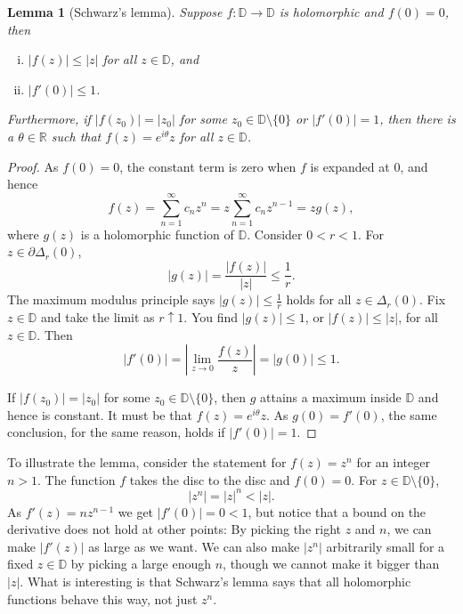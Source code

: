 \documentclass[12pt,openany]{book}
\newcommand{\sabs}[1]{\lvert {#1} \rvert}
\newcommand{\abs}[1]{\left\lvert {#1} \right\rvert}
\newcommand{\R}{{\mathbb{R}}}
\newcommand{\D}{{\mathbb{D}}}
\theoremstyle{plain}
\newtheorem{lemma}[thm]{Lemma}
\theoremstyle{remark}
\theoremstyle{definition}
\theoremstyle{exercise}
\theoremstyle{example}
\begin{document}
\begin{lemma}[Schwarz's lemma]\label{lemma:schwarz}
Suppose $f \colon \D \to \D$ is holomorphic and $f(0) = 0$,
then 
\begin{enumerate}[(i)]
\item $\sabs{f(z)} \leq \sabs{z}$ for all $z \in \D$, and
\item $\sabs{f'(0)} \leq 1$.
\end{enumerate}
Furthermore, if $\sabs{f(z_0)} = \sabs{z_0}$ for some $z_0 \in \D \setminus
\{ 0 \}$
or $\sabs{f'(0)} = 1$, then
there is a $\theta \in \R$ such that $f(z) =
e^{i\theta} z$ for all $z \in \D$.
\end{lemma}

\begin{proof}
As $f(0) = 0$, the constant term is zero when $f$ is expanded at $0$, and hence
\begin{equation*}
f(z) = \sum_{n=1}^\infty c_n z^n = z \sum_{n=1}^\infty c_n z^{n-1} = z g(z) ,
\end{equation*}
where $g(z)$ is a holomorphic function of $\D$.
Consider $0 < r < 1$.
For $z \in \partial \Delta_r(0)$,
\begin{equation*}
\sabs{g(z)} = \frac{\sabs{f(z)}}{\sabs{z}} \leq \frac{1}{r}  .
\end{equation*}
The maximum modulus principle says $\sabs{g(z)} \leq \frac{1}{r}$
holds for all $z \in \Delta_r(0)$.
Fix $z \in \D$ and take the limit as $r \uparrow 1$. 
You find
$\sabs{g(z)} \leq 1$,
or
$\sabs{f(z)} \leq \sabs{z}$,
for all $z \in \D$.  Then
\begin{equation*}
\abs{f'(0)}
=
\abs{\lim_{z \to 0} \frac{f(z)}{z}} = \sabs{g(0)} \leq 1 .
\end{equation*}

If $\sabs{f(z_0)} = \sabs{z_0}$ for some $z_0 \in \D \setminus \{ 0 \}$,
then $g$ attains a maximum inside $\D$ and hence is constant.
It must be that $f(z) = e^{i \theta} z$.
As $g(0) = f'(0)$, the same conclusion, for the same reason,
holds if $\sabs{f'(0)} = 1$.
\end{proof}

To illustrate the lemma, consider the statement for $f(z) = z^n$
for an integer $n > 1$.  The function $f$ takes the disc to the disc
and $f(0) = 0$.  For $z \in \D \setminus \{ 0 \}$,
\begin{equation*}
\sabs{z^n} =
\sabs{z}^n < \sabs{z} .
\end{equation*}
As $f'(z) = n z^{n-1}$ we get
$\sabs{f'(0)} = 0 < 1$, but notice that a bound on the derivative
does not hold at other points:
By picking the right $z$ and $n$,
we can make $\sabs{f'(z)}$ as large as we want.
We can also make $\sabs{z^n}$ arbitrarily small for a fixed $z \in \D$ by picking
a large enough $n$, though we cannot make it bigger than $\sabs{z}$.  What is
interesting is that Schwarz's lemma says that all holomorphic functions
behave this way, not just $z^n$.
\end{document}
